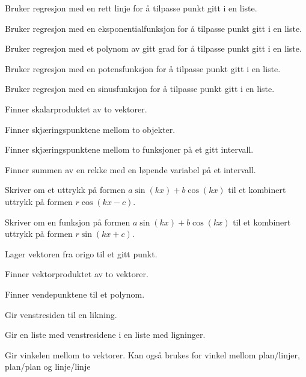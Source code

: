 {Bruker regresjon med en rett linje for å tilpasse punkt gitt i en liste.}

{Bruker regresjon med en eksponentialfunksjon for å tilpasse punkt gitt i en liste.}

{Bruker regresjon med et polynom av gitt grad for å tilpasse punkt gitt i en liste.}

{Bruker regresjon med en potensfunksjon for å tilpasse punkt gitt i en liste.}

{Bruker regresjon med en sinusfunksjon for å tilpasse punkt gitt i en liste.	}

{Finner skalarproduktet av to vektorer. 
	
	}

{Finner skjæringspunktene mellom to objekter. 
}

{Finner skjæringspunktene mellom to funksjoner på et gitt intervall.}

 {
Finner summen av en rekke med en løpende variabel på et intervall.
}

{Skriver om et uttrykk på formen $ a\sin (kx) + b\cos (kx) $ til et kombinert uttrykk på formen $ r\cos (kx-c) $.}

{Skriver om en funksjon på formen $ {a\sin (kx) + b\cos (kx) }$ til et kombinert uttrykk på formen $ r\sin (kx+c) $.}


 {
Lager vektoren fra origo til et gitt punkt. \\
}

{Finner vektorproduktet av to vektorer. \\
}

{Finner vendepunktene til et polynom.}

{Gir venstresiden til en likning.}

{Gir en liste med venstresidene i en liste med ligninger.}

{Gir vinkelen mellom to vektorer. Kan også brukes for vinkel mellom plan/linjer, plan/plan og linje/linje}







\regsin

\retn

\skalar



\summ



\trikomb

\vektor

\vekpro

\vend

